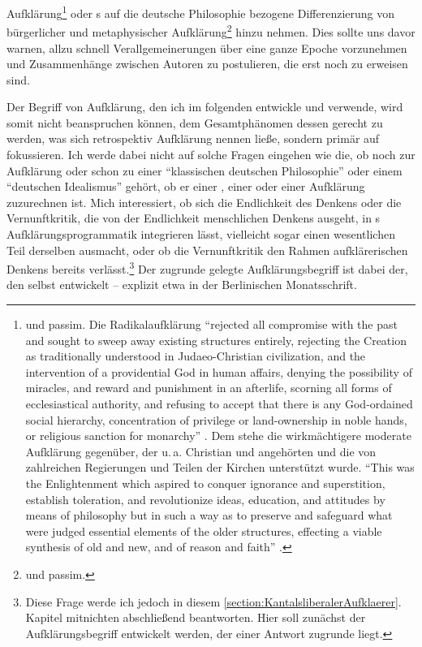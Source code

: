 Aufklärung\footnote{\cite[Vgl.][3--13]{Israel:RadicalEnlightenment2001} und
passim. Die Radikalaufklärung \enquote{rejected all compromise with the past and
sought to sweep away existing structures entirely, rejecting the Creation as
traditionally understood in Judaeo-Christian civilization, and the intervention
of a providential God in human affairs, denying the possibility of miracles, and
reward and punishment in an afterlife, scorning all forms of ecclesiastical
authority, and refusing to accept that there is any God-ordained social
hierarchy, concentration of privilege or land-ownership in noble hands, or
religious sanction for monarchy}
\parencite[][\pno~11\,f.]{Israel:RadicalEnlightenment2001}. Dem stehe die
wirkmächtigere moderate Aufklärung gegenüber, der u.\,a.
Christian 
und 
angehörten und die von zahlreichen Regierungen und Teilen der Kirchen
unterstützt wurde. \enquote{This was the Enlightenment which aspired to conquer
ignorance and superstition, establish toleration, and revolutionize ideas,
education, and attitudes by means of philosophy but in such a way as to preserve
and safeguard what were judged essential elements of the older structures,
effecting a viable synthesis of old and new, and of reason and faith}
\parencite[][11]{Israel:RadicalEnlightenment2001}.} oder
s auf die deutsche Philosophie
bezogene Differenzierung von bürgerlicher und metaphysischer
Aufklärung\footnote{\cite[Vgl.][14--9]{Hunter:RivalEnlightenments2001} und
passim.} hinzu nehmen. Dies sollte uns davor warnen, allzu schnell
Verallgemeinerungen über eine ganze Epoche vorzunehmen und Zusammenhänge
zwischen Autoren zu postulieren, die erst noch zu erweisen sind.

Der Begriff von Aufklärung, den ich im folgenden entwickle und verwende, wird
somit nicht beanspruchen können, dem Gesamtphänomen dessen gerecht zu werden,
was sich retrospektiv  Aufklärung nennen ließe, sondern primär
auf  fokussieren. Ich werde dabei nicht auf solche Fragen
eingehen wie die, ob  noch zur Aufklärung oder schon zu
einer \enquote{klassischen deutschen Philosophie} oder einem \enquote{deutschen
Idealismus} gehört, ob er einer , einer
 oder einer  Aufklärung
zuzurechnen ist. Mich interessiert, ob sich die Endlichkeit des Denkens oder die
Vernunftkritik, die von der Endlichkeit menschlichen Denkens ausgeht, in
s Aufklärungsprogrammatik integrieren lässt, vielleicht
sogar einen wesentlichen Teil derselben ausmacht, oder ob die Vernunftkritik den
Rahmen aufklärerischen Denkens bereits verlässt.\footnote{Diese Frage werde ich
jedoch in diesem \ref{section:KantalsliberalerAufklaerer}. Kapitel mitnichten
abschließend beantworten. Hier soll zunächst der Aufklärungsbegriff entwickelt
werden, der einer Antwort zugrunde liegt.} Der zugrunde gelegte
Aufklärungsbegriff ist dabei der, den  selbst entwickelt --
explizit etwa in der Berlinischen Monatsschrift.

